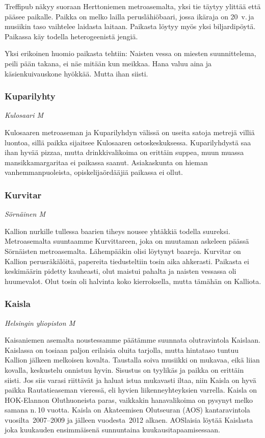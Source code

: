 \documentclass[../ala_hataile.tex]{subfiles}
\begin{document}
Treffipub näkyy suoraan Herttoniemen
metroasemalta, yksi tie täytyy ylittää että
pääsee paikalle. Paikka on melko lailla peruslähiöbaari,
jossa ikäraja on 20~v.\,ja musiikin
taso vaihtelee laidasta laitaan. Paikasta
löytyy myös yksi biljardipöytä. Paikassa
käy todella heterogeenistä jengiä. 

Yksi
erikoinen huomio paikasta tehtiin: Naisten
vessa on miesten suunnittelema, peili pään
takana, ei näe mitään kun meikkaa. Hana
valuu aina ja käsienkuivauskone
hyökkää.
Mutta ihan siisti.
\subsubsection*{Kuparilyhty}
\textit{Kulosaari M}

Kulosaaren metroaseman ja Kuparilyhdyn
välissä on useita satoja metrejä villiä
luontoa, sillä paikka sijaitsee Kulosaaren
ostoskeskuksessa.
Kuparilyhdystä saa ihan
hyvää pizzaa, mutta drinkkivalikoima on
erittäin suppea, muun muassa mansikkamargaritaa
ei paikassa saanut. Asiakaskunta
on hieman vanhemmanpuoleista, opiskelijaördääjiä
paikassa ei ollut.
\subsubsection*{Kurvitar}
\textit{Sörnäinen M}

Kallion nurkille tullessa baarien tiheys
nousee yhtäkkiä todella suureksi. Metroasemalta
suuntaamme Kurvittareen, joka
on muutaman askeleen päässä Sörnäisten
metroasemalta. Lähempääkin olisi löytynyt
baareja. Kurvitar on Kallion perusräkälöitä,
papereita tiedusteltiin tosin aika ahkerasti.
Paikasta ei keskimäärin pidetty kauheasti,
olut maistui pahalta ja naisten vessassa oli
huumevalot. Olut tosin oli halvinta koko
kierroksella, mutta tämähän on Kalliota.
\subsubsection*{Kaisla}
\textit{Helsingin yliopiston M}

Kaisaniemen asemalta noustessamme
päätämme suunnata olutravintola Kaislaan.
Kaislassa on tosiaan paljon erilaisia oluita
tarjolla, mutta hintataso tuntuu Kallion
jälkeen melkoisen kovalta. Taustalla soiva
musiikki on mukavaa, eikä liian kovalla,
keskustelu onnistuu hyvin. Sisustus on tyylikäs
ja paikka on erittäin siisti. Jos siis varasi
riittävät ja haluat istua mukavasti iltaa,
niin Kaisla on hyvä paikka Rautatieaseman
vieressä, eli hyvien liikenneyhteyksien varrella. Kaisla on HOK-Elannon Oluthuoneista
paras, vaikkakin hanavalikoima on
pysynyt melko samana n.\,10 vuotta. Kaisla
on Akateemisen Olutseuran (AOS) kantaravintola
vuosilta~2007--2009 ja jälleen
vuodesta~2012 alkaen. AOSlaisia löytää
Kaislasta joka kuukauden ensimmäisenä
sunnuntaina kuukausitapaamisessaan.
\end{document}
